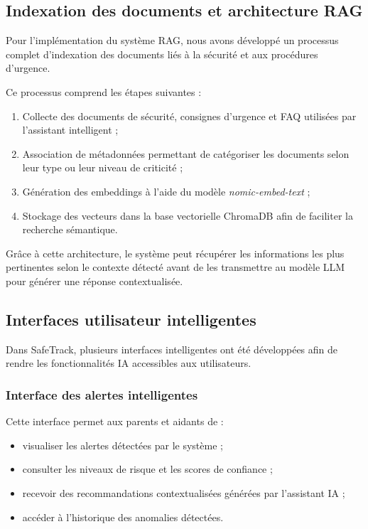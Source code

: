 \subsection{Indexation des documents et architecture RAG}

Pour l’implémentation du système RAG, nous avons développé un processus complet d’indexation des documents liés à la sécurité et aux procédures d’urgence.

Ce processus comprend les étapes suivantes :

\begin{enumerate}
    \item Collecte des documents de sécurité, consignes d’urgence et FAQ utilisées par l’assistant intelligent ;
    
    \item Association de métadonnées permettant de catégoriser les documents selon leur type ou leur niveau de criticité ;
    
    \item Génération des embeddings à l’aide du modèle \textit{nomic-embed-text} ;
    
    \item Stockage des vecteurs dans la base vectorielle ChromaDB afin de faciliter la recherche sémantique.
\end{enumerate}

Grâce à cette architecture, le système peut récupérer les informations les plus pertinentes selon le contexte détecté avant de les transmettre au modèle LLM pour générer une réponse contextualisée.

\subsection{Interfaces utilisateur intelligentes}

Dans SafeTrack, plusieurs interfaces intelligentes ont été développées afin de rendre les fonctionnalités IA accessibles aux utilisateurs.

\subsubsection{Interface des alertes intelligentes}

Cette interface permet aux parents et aidants de :

\begin{itemize}
    \item visualiser les alertes détectées par le système ;
    
    \item consulter les niveaux de risque et les scores de confiance ;
    
    \item recevoir des recommandations contextualisées générées par l’assistant IA ;
    
    \item accéder à l’historique des anomalies détectées.
\end{itemize}

